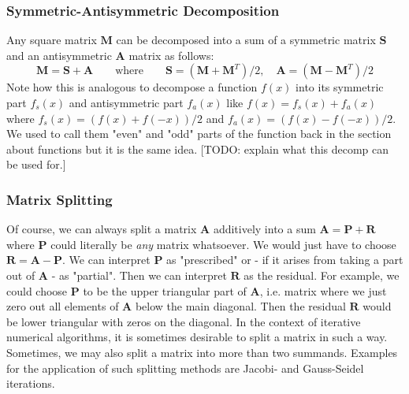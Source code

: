 \subsubsection{Symmetric-Antisymmetric Decomposition}
Any square matrix $\mathbf{M}$ can be decomposed into a sum of a symmetric matrix $\mathbf{S}$ and an antisymmetric $\mathbf{A}$ matrix as follows:
\begin{equation}
\mathbf{M} = \mathbf{S + A} \qquad \text{where}  \qquad
\mathbf{S} = (\mathbf{M} + \mathbf{M}^T) / 2,  \quad
\mathbf{A} = (\mathbf{M} - \mathbf{M}^T) / 2
\end{equation}
Note how this is analogous to decompose a function $f(x)$ into its symmetric part $f_s(x)$ and antisymmetric part $f_a(x)$ like $f(x) = f_s(x) + f_a(x)$ where $f_s(x) = (f(x) + f(-x)) / 2$ and $f_a(x) = (f(x) - f(-x)) / 2$. We used to call them "even" and "odd" parts of the function back in the section about functions but it is the same idea. [TODO: explain what this decomp can be used for.]


\subsubsection{Matrix Splitting}
Of course, we can always split a matrix $\mathbf{A}$ additively into a sum $\mathbf{A} = \mathbf{P + R}$ where $\mathbf{P}$ could literally be \emph{any} matrix whatsoever. We would just have to choose $\mathbf{R} = \mathbf{A - P}$. We can interpret $\mathbf{P}$ as "prescribed" or - if it arises from taking a part out of $\mathbf{A}$ - as "partial". Then we can interpret $\mathbf{R}$ as the residual. For example, we could choose $\mathbf{P}$ to be the upper triangular part of $\mathbf{A}$, i.e. matrix where we just zero out all elements of $\mathbf{A}$ below the main diagonal. Then the residual $\mathbf{R}$ would be lower triangular with zeros on the diagonal. In the context of iterative numerical algorithms, it is sometimes desirable to split a matrix in such a way. Sometimes, we may also split a matrix into more than two summands. Examples for the application of such splitting methods are Jacobi- and Gauss-Seidel iterations.



